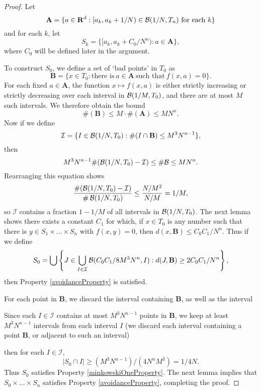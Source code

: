 \begin{proof}
    Let
    \[ \mathbf{A} = \{ a \in \mathbf{R}^d : [a_k, a_k + 1/N) \in \operatorname{\mathcal{B}}(1/N,T_n)\ \text{for each $k$} \} \]
    and for each $k$, let
    \[ S_k = \{ [a_k,a_k + C_0/N^n): a \in \mathbf{A} \}, \]
    where $C_0$ will be defined later in the argument.

    To construct $S_0$, we define a set of `bad points' in $T_0$ as
    \[ \mathbf{B} = \{ x \in T_0: \text{there is}\ a \in \mathbf{A}\ \text{such that}\ f(x,a) = 0 \}. \]
    For each fixed $a \in \mathbf{A}$, the function $x \mapsto f(x,a)$ is either strictly increasing or strictly decreasing over each interval in $\operatorname{\mathcal{B}}(1/M,T_0)$, and there are at most $M$ such intervals. We therefore obtain the bound
    \[ \#(\mathbf{B}) \leq M \cdot \#(\mathbf{A}) \leq MN^n. \]
    Now if we define
    \[ \mathcal{I} = \{ I \in \operatorname{\mathcal{B}}(1/N,T_0): \# (I \cap \mathbf{B}) \leq M^3N^{n-1} \}, \]
    then
    \[ M^3N^{n-1} \#(\operatorname{\mathcal{B}}(1/N,T_0) - \mathcal{I}) \leq \# \mathcal{B}  \leq MN^n. \]
    Rearranging this equation shows
    \[ \frac{\#(\operatorname{\mathcal{B}}(1/N,T_0) - \mathcal{I})}{\# \operatorname{\mathcal{B}}(1/N,T_0)} \leq \frac{N/M^2}{N/M} = 1/M, \]
    so $\mathcal{I}$ contains a fraction $1 - 1/M$ of all intervals in $\operatorname{\mathcal{B}}(1/N,T_0)$. The next lemma shows there exists a constant $C_1$ for which, if $x \in T_0$ is any number such that there is $y \in S_1 \times \dots \times S_n$ with $f(x,y) = 0$, then $d(x,\mathbf{B}) \leq C_0C_1/N^n$. Thus if we define
    \[ S_0 = \bigcup \left\{ J \in \bigcup_{I \in \mathcal{I}} \operatorname{\mathcal{B}}(C_0C_1/8M^3N^n, I) : d(J,\mathbf{B}) \geq 2C_0C_1/N^n \right\}, \]
    then Property \ref{avoidanceProperty} is satisfied.

    For each point in $\mathbf{B}$, we discard the interval containing $\mathbf{B}$, as well as the interval

    Since each $I \in \mathcal{I}$ contains at most $M^3N^{n-1}$ points in $\mathbf{B}$, we keep at least $M^3N^{n-1}$ intervals from each interval $I$ (we discard each interval containing a point $\mathbf{B}$, or adjacent to such an interval)

    then for each $I \in \mathcal{I}$,
    \[ |S_0 \cap I| \geq (M^3N^{n-1})/(4N^nM^3) = 1/4N. \]
    Thus $S_0$ satisfies Property \ref{minkowskiOneProperty}. The next lemma implies that $S_0 \times \dots \times S_n$ satisfies Property \ref{avoidanceProperty}, completing the proof.
\end{proof}

